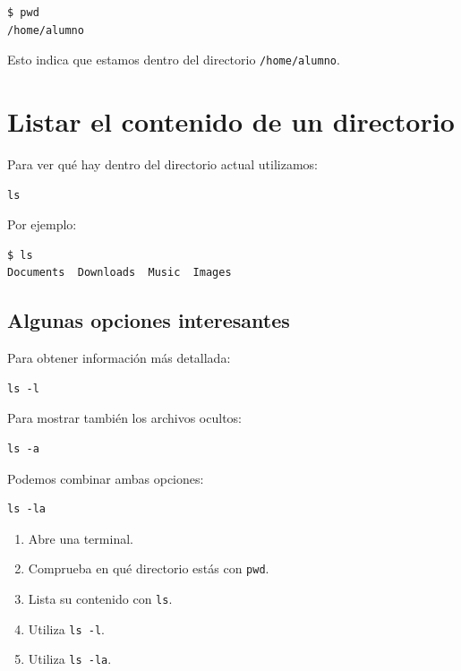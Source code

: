 \documentclass[11pt,a4paper]{article}
\begin{document}
\begin{lstlisting}
$ pwd
/home/alumno
\end{lstlisting}


\noindent Esto indica que estamos dentro del directorio
\texttt{/home/alumno}.


\section{Listar el contenido de un directorio}


Para ver qué hay dentro del directorio actual utilizamos:


\begin{lstlisting}
ls
\end{lstlisting}


\noindent Por ejemplo:


\begin{lstlisting}
$ ls
Documents  Downloads  Music  Images
\end{lstlisting}


\subsection{Algunas opciones interesantes}


Para obtener información más detallada:


\begin{lstlisting}
ls -l
\end{lstlisting}


\noindent Para mostrar también los archivos ocultos:


\begin{lstlisting}
ls -a
\end{lstlisting}


\noindent Podemos combinar ambas opciones:


\begin{lstlisting}
ls -la
\end{lstlisting}


\begin{ejercicio}
\begin{enumerate}
    \item Abre una terminal.
    \item Comprueba en qué directorio estás con \texttt{pwd}.
    \item Lista su contenido con \texttt{ls}.
    \item Utiliza \texttt{ls -l}.
    \item Utiliza \texttt{ls -la}.
\end{enumerate}
\end{ejercicio}
\end{document}

